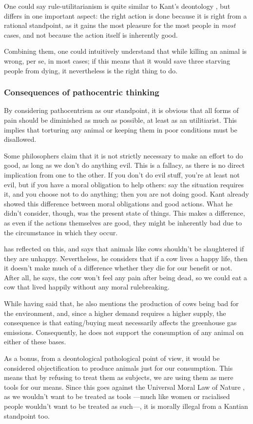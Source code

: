 \documentclass{myassignment}
\begin{document}
\begin{answer}
		One could say rule-utilitarianism is quite similar to Kant's deontology \autocite{kant}, but differs in one important aspect: the right action is done because it is right from a rational standpoint, as it gains the most pleasure for the most people in \emph{most} cases, and not because the action itself is inherently good.

		Combining them, one could intuitively understand that while killing an animal is wrong, per se, in most cases; if this means that it would save three starving people from dying, it nevertheless is the right thing to do.

		\subsubsection*{Consequences of pathocentric thinking}%

		By considering pathocentrism as our standpoint, it is obvious that all forms of pain should be diminished as much as possible, at least as an utilitiarist. This implies that torturing any animal or keeping them in poor conditions must be disallowed. 

		Some philosophers claim that it is not strictly necessary to make an effort to do good, as long as we don't do anything evil. This is a fallacy, as there is no direct implication from one to the other. If you don't do evil stuff, you're at least not evil, but if you have a moral obligation to help others: say the situation requires it, and you choose not to do anything; then you are not doing good. Kant already showed this difference between moral obligations and good actions. What he didn't consider, though, was the present state of things. This makes a difference, as even if the actions themselves are good, they might be inherently bad due to the circumstance in which they occur.

		\citet{singeryoutube} has reflected on this, and says that animals like cows shouldn't be slaughtered if they are unhappy. Nevertheless, he considers that if a cow lives a happy life, then it doesn't make much of a difference whether they die for our benefit or not. After all, he says, the cow won't feel any pain after being dead, so we could eat a cow that lived happily without any moral rulebreaking.

		While having said that, he also mentions the production of cows being bad for the environment, and, since a higher demand requires a higher supply, the consequence is that eating/buying meat necessarily affects the greenhouse gas emissions. Consequently, he does not support the consumption of any animal on either of these bases.

		As a bonus, from a deontological pathological point of view, it would be considered objectification to produce animals just for our consumption. This means that by refusing to treat them as subjects, we are using them as mere tools for our means. Since this goes against the Universal Moral Law of Nature \autocite{universallaw}, as we wouldn't want to be treated as tools ---much like women or racialised people wouldn't want to be treated as such---, it is morally illegal from a Kantian standpoint too.
 	\end{answer}

 	\printbibliography
\end{document}
